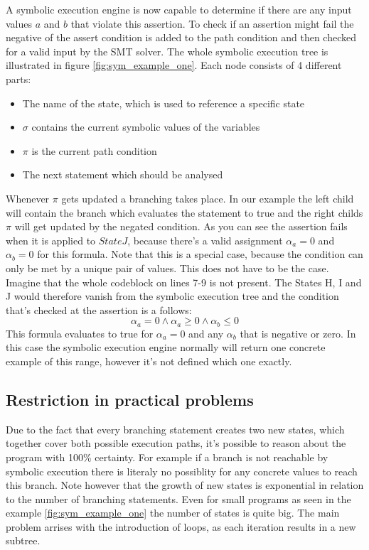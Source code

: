 A symbolic execution engine is now capable to determine if there are any input values $a$  and $b$ that violate this assertion. To check if an assertion might fail the negative of the assert condition is added to the path condition and then checked for a valid input by the SMT solver. The whole symbolic execution tree is illustrated in figure \ref{fig:sym_example_one}. Each node consists of 4 different parts:
\begin{itemize}
\item The name of the state, which is used to reference a specific state
\item $\sigma$ contains the current symbolic values of the variables
\item $\pi$ is the current path condition
\item The next statement which should be analysed
\end{itemize}
Whenever $\pi$ gets updated a branching takes place. In our example the left child will contain the branch which evaluates the statement to true and the right childs $\pi$ will get updated by the negated condition.
As you can see the assertion fails when it is applied to $State J$, because there's a valid assignment $\alpha_a = 0$ and $\alpha_b = 0$ for this formula. Note that this is a special case, because the condition can only be met by a unique pair of values. This does not have to be the case. Imagine that the whole codeblock on lines 7-9 is not present. The States H, I and J would therefore vanish from the symbolic execution tree and the condition that's checked at the assertion is a follows:
$$\alpha_a  = 0 \land \alpha_a \geq 0 \land \alpha_b \leq 0$$
This formula evaluates to true for $\alpha_a = 0$  and any $\alpha_b$ that is negative or zero. In this case the symbolic execution engine normally will return one concrete example of this range, however it's not defined which one exactly. 
\subsection{Restriction in practical problems}\label{section:symbolic_restrictions}
Due to the fact that every branching statement creates two new states, which together cover both possible execution paths, it's possible to reason about the program with 100\% certainty. For example if a branch is not reachable by symbolic execution there is literaly no possiblity for any concrete values to reach this branch. Note however that the growth of new states is exponential in relation to the number of branching statements. Even for small programs as seen in the example \ref{fig:sym_example_one} the number of states is quite big. The main problem arrises with the introduction of loops, as each iteration results in a new subtree.

